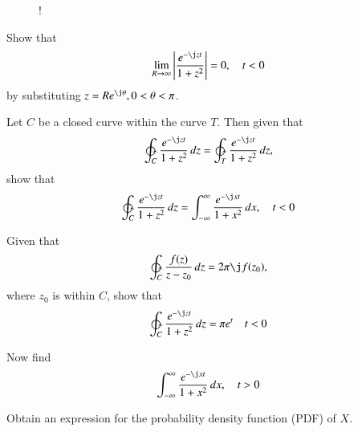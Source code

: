 \documentclass[journal,12pt,twocolumn]{IEEEtran}
\begin{document}
\begin{figure}[!h]
\centering
\resizebox {\columnwidth} {!} {

}
\caption{}
\label{fig:contour}
\end{figure}
\begin{problem}
Show that
\begin{equation}
\lim_{R\to \infty}\abs{ \frac{e^{-\j zt}}{1+z^2}} = 0, \quad t < 0
\end{equation}
by substituting $z = Re^{\j \theta}, 0 < \theta < \pi$.
\end{problem}
%
\begin{problem}
Let $C$ be a closed curve within the curve $T$.  Then given that
\begin{equation}
\ointctrclockwise_C \frac{e^{-\j zt}}{1+z^2}\,dz = \ointctrclockwise_T \frac{e^{-\j zt}}{1+z^2}\,dz,
\end{equation}
show that
\begin{equation}
\ointctrclockwise_C \frac{e^{-\j zt}}{1+z^2}\,dz = \int_{-\infty}^{\infty} \frac{e^{-\j x t}}{1+x^2}\,dx, \quad t < 0
\end{equation}
\end{problem}
\begin{problem}
Given that
\begin{equation}
\ointctrclockwise_C \frac{f(z)}{z-z_0}\,dz = 2\pi \j f(z_0), 
\end{equation}
%
where $z_0$ is within $C$, show that
\begin{equation}
\ointctrclockwise_C \frac{e^{-\j zt}}{1+z^2}\,dz = \pi e^t \quad t < 0
\end{equation}
\end{problem}
\begin{problem}
Now find 
\begin{equation}
\int_{-\infty}^{\infty} \frac{e^{-\j x t}}{1+x^2}\,dx, \quad t > 0
\end{equation}
\end{problem}
%
\begin{problem}
Obtain an expression for the probability density function (PDF) of $X$.
\end{problem}
\end{document}
